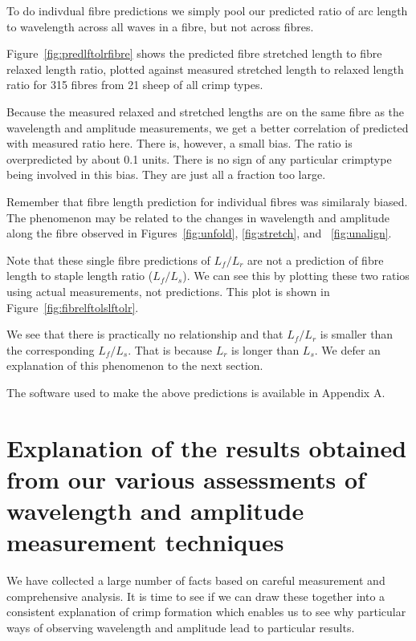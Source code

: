 \documentclass[titlepage,10pt]{article}  %
\begin{document}
To do indivdual fibre predictions we simply pool our predicted ratio of arc length to wavelength across all waves in a fibre, but not across fibres. 

Figure~\ref{fig:predlftolrfibre} shows the predicted fibre stretched length to fibre relaxed length ratio, plotted against measured stretched length to relaxed length ratio for 315 fibres from 21 sheep of all crimp types. 



Because the measured relaxed and stretched lengths are on the same fibre as the wavelength and amplitude measurements, we get a better correlation of predicted with measured ratio here. There is, however, a small bias. The ratio is overpredicted by about 0.1 units. There is no sign of any particular crimptype being involved in this bias. They are just all a fraction too large. 

Remember that fibre length prediction for individual fibres was similaraly biased. The phenomenon may be related to the changes in wavelength and amplitude along the fibre observed in Figures~\ref{fig:unfold}, \ref{fig:stretch}, and ~\ref{fig:unalign}.

Note that these single fibre predictions  of $L_{f}/L_{r}$ are not a prediction of fibre length to staple length ratio ($L_{f}/L_{s}$). We can see this by plotting these two ratios using actual measurements, not predictions. This plot is shown in Figure~\ref{fig:fibrelftolslftolr}.

We see that there is practically no relationship and that $L_{f}/L_{r}$ is smaller than the corresponding $L_{f}/L_{s}$. That is because $L_{r}$ is longer than $L_{s}$. We defer an explanation of this phenomenon to the next section.

The software used to make the above predictions is available in Appendix A.

\clearpage
\section{Explanation of the results obtained from our various assessments of wavelength and amplitude measurement techniques}

We have collected a large number of facts based on careful measurement and comprehensive analysis. It is time to see if we can draw these together into a consistent explanation of crimp formation which enables us to see why particular ways of observing wavelength and amplitude lead to particular results.
\end{document}

